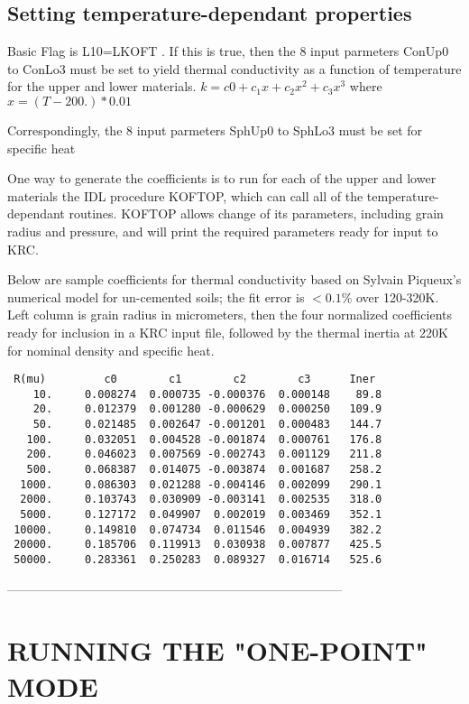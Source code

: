 \documentclass{article}
\begin{document}
\subsection{Setting temperature-dependant properties} %

Basic Flag is L10=LKOFT . If this is true, then the 8 input parmeters ConUp0 to
ConLo3 must be set to yield thermal conductivity as a function of temperature
for the upper and lower materials. $ k=c0 +c_1x + c_2x^2 +c_3x^3 $ where
$x=(T-200.)*0.01$ 

Correspondingly, the 8 input parmeters SphUp0 to SphLo3 must be set for specific
heat
 
One way to generate the coefficients is to run for each of the upper and lower
materials the IDL procedure KOFTOP, which can call all of the
temperature-dependant routines. KOFTOP allows change of its parameters,
including grain radius and pressure, and will print the required parameters
ready for input to KRC.

Below are sample coefficients for thermal conductivity based on Sylvain
Piqueux's numerical model for un-cemented soils; the fit error is $<0.1$\% over
120-320K. Left column is grain radius in micrometers, then the four normalized
coefficients ready for inclusion in a KRC input file, followed by the thermal
inertia at 220K for nominal density and specific heat.
\vspace{-3.mm} 
\begin{verbatim}
 R(mu)         c0        c1        c2        c3      Iner  
    10.     0.008274  0.000735 -0.000376  0.000148    89.8 
    20.     0.012379  0.001280 -0.000629  0.000250   109.9 
    50.     0.021485  0.002647 -0.001201  0.000483   144.7 
   100.     0.032051  0.004528 -0.001874  0.000761   176.8 
   200.     0.046023  0.007569 -0.002743  0.001129   211.8 
   500.     0.068387  0.014075 -0.003874  0.001687   258.2 
  1000.     0.086303  0.021288 -0.004146  0.002099   290.1 
  2000.     0.103743  0.030909 -0.003141  0.002535   318.0 
  5000.     0.127172  0.049907  0.002019  0.003469   352.1 
 10000.     0.149810  0.074734  0.011546  0.004939   382.2 
 20000.     0.185706  0.119913  0.030938  0.007877   425.5 
 50000.     0.283361  0.250283  0.089327  0.016714   525.6 
\end{verbatim}

--------------------------------------------------------------------------------

 \section{RUNNING THE "ONE-POINT" MODE} %
\end{document}
